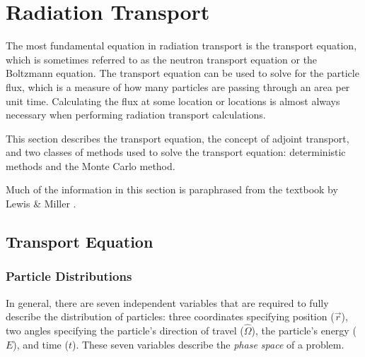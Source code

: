 \section{Radiation Transport}
\label{sec:bg:rt}

The most fundamental equation in radiation transport is the transport equation, which is sometimes referred to as the neutron transport equation or the Boltzmann equation.
The transport equation can be used to solve for the particle flux, which is a measure of how many particles are passing through an area per unit time.
Calculating the flux at some location or locations is almost always necessary when performing radiation transport calculations.

This section describes the transport equation, the concept of adjoint transport, and two classes of methods used to solve the transport equation: deterministic methods and the Monte Carlo method.

Much of the information in this section is paraphrased from the textbook by Lewis \& Miller \cite{lewis_miller}.

\subsection{Transport Equation}
\label{sec:bg:rt:te}

\subsubsection{Particle Distributions}
\label{sec:bg:rt:te:pd}

In general, there are seven independent variables that are required to fully describe the distribution of particles: three coordinates specifying position ($\vec{r}$), two angles specifying the particle's direction of travel ($\hat{\Omega}$), the particle's energy ($E$), and time ($t$).
These seven variables describe the \textit{phase space} of a problem.

